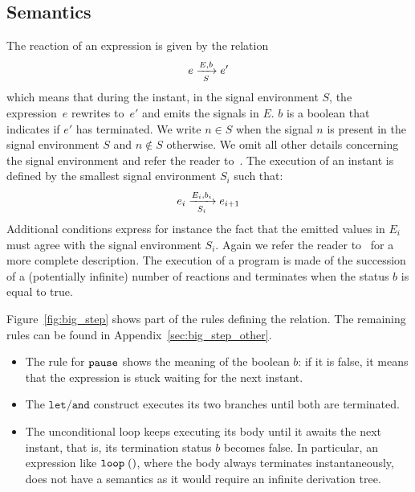\documentclass[9pt,preprint]{sigplanconf}
\begin{document}
\subsection{Semantics}

The reaction of an expression is given by the relation
\[  \bigstep{N}{e}{e'}{E}{b}{S} \]
which means that during the instant, in the signal environment $S$, the expression~$e$ rewrites to~$e'$ and emits the signals in $E$. $b$ is a boolean that indicates if $e'$ has terminated. We write $n \in S$ when the signal $n$ is present in the signal environment $S$ and $n \not\in S$ otherwise. We omit all other details concerning the signal environment and refer the reader to~\cite{Mandel:2005}.
%
The execution of an instant is defined by the smallest signal environment $S_i$ such that:
\[ \bigstep{N}{e_i}{e_{i+1}}{E_i}{b_i}{S_i} \]
Additional conditions express for instance the fact that the emitted values in $E_i$ must agree with the signal environment $S_i$. Again we refer the reader to~\cite{Mandel:2005} for a more complete description.
The execution of a program is made of the succession of a (potentially infinite) number of reactions and terminates when the status $b$ is equal to true.


Figure~\ref{fig:big_step} shows part of the rules defining the relation. The remaining rules can be found in Appendix~\ref{sec:big_step_other}. 
\begin{itemize}
\item  The rule for $\epause{}$ shows the meaning of the boolean $b$: if it is false, it means that the expression is stuck waiting for the next instant.
\item The $\mathtt{let}/\mathtt{and}$ construct executes its two branches until both are terminated.
\item The unconditional loop keeps executing its body until it awaits the next instant, that is, its termination status $b$ becomes false. In particular, an expression like $\eloop{\evoid{}}$, where the body always terminates instantaneously, does not have a semantics as it would require an infinite derivation tree.
\end{itemize}

\begin{figure*}



\caption{Big-step semantics}
\label{fig:big_step}
\end{figure*}
\end{document}
